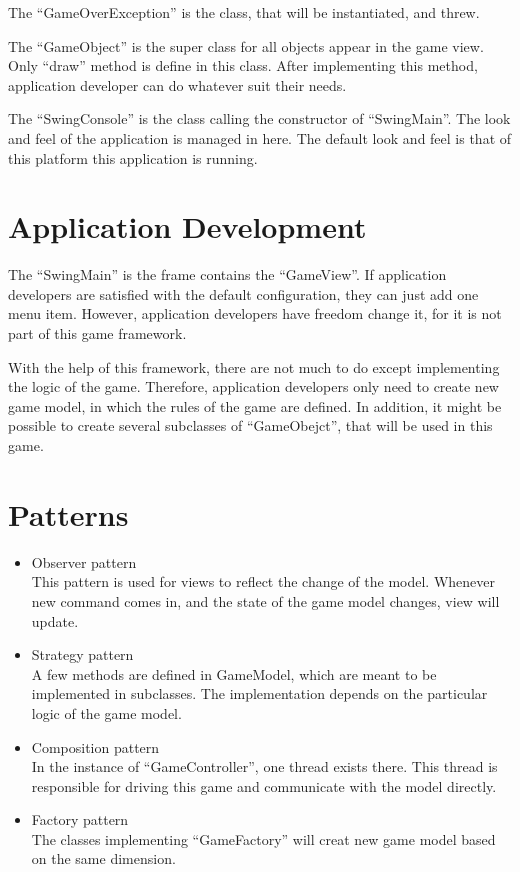 \documentclass{report}
\begin{document}
The ``GameOverException'' is the class, that will be instantiated, and threw.

The ``GameObject'' is the super class for all objects appear in the game view. Only ``draw'' method is define in this class. After implementing this 
method, application developer can do whatever suit their needs.

The ``SwingConsole'' is the class calling the constructor of ``SwingMain''. The look and feel of the application is managed in here. The default look 
and feel is that of this platform this application is running.
\section{Application Development}
The ``SwingMain'' is the frame contains the ``GameView''. If application developers are satisfied with the default configuration, they can just add 
one menu item. However, application developers have freedom change it, for it is not part of this game framework.

With the help of this framework, there are not much to do except implementing the logic of the game. Therefore, application developers only need to 
create new game model, in which the rules of the game are defined. In addition, it might be possible to create several subclasses of ``GameObejct'', 
that will be used in this game.
\section{Patterns}
\begin{itemize}
	\item Observer pattern \\
		This pattern is used for views to reflect the change of the model. Whenever new command comes in, and the state of the game model changes, 
		view will update.
	\item Strategy pattern \\
		A few methods are defined in GameModel, which are meant to be implemented in subclasses. The implementation depends on the particular logic 
		of the game model.
	\item Composition pattern \\
		In the instance of ``GameController'', one thread exists there. This thread is responsible for driving this game and communicate with the 
		model directly.
	\item Factory pattern \\
		The classes implementing ``GameFactory'' will creat new game model based on the same dimension.
\end{itemize}
\end{document}
